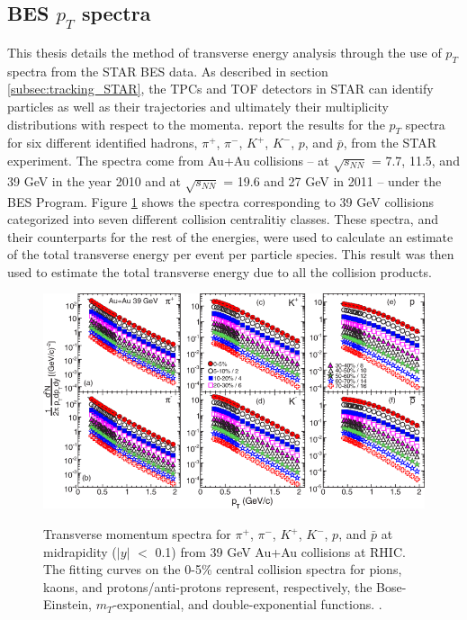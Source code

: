 \subsection{BES $p_{T}$ spectra}
This thesis details the method of transverse energy analysis through the use of $p_{T}$ spectra from the STAR BES data. As described in section \ref{subsec:tracking_STAR}, the TPCs and TOF detectors in STAR can identify particles as well as their trajectories and ultimately their multiplicity distributions with respect to the momenta. \citet{PhysRevC.96.044904} report the results for the $p_{T}$ spectra for six different identified hadrons, $\pi^+$, $\pi^-$, $K^+$, $K^-$, $p$, and $\bar{p}$, from the STAR experiment. The spectra come from Au+Au collisions -- at $\sqrt{s_{NN}}$ = 7.7, 11.5, and 39 GeV in the year 2010 and at $\sqrt{s_{NN}}$ = 19.6 and 27 GeV in 2011 -- under the BES Program. Figure \ref{fig:BESPaper_pTSpectra} \cite{PhysRevC.96.044904} shows the spectra corresponding to 39 GeV collisions categorized into seven different collision centralitiy classes. These spectra, and their counterparts for the rest of the energies, were used to calculate an estimate of the total transverse energy per event per particle species. This result was then used to estimate the total transverse energy due to all the collision products.
\begin{figure}[h]
  \centering
  \includegraphics[width=6.5in]{../figures/PhysRevC-96-044904_pTSpectra_39.png}\\
  \caption{Transverse momentum spectra for $\pi^{+}$, $\pi^{-}$, $K^+$, $K^{-}$, $p$, and $\bar{p}$ at midrapidity ($|y|$ $<$ 0.1) from 39 GeV Au+Au collisions at RHIC. The fitting curves on the 0-5\% central collision spectra for pions, kaons, and protons/anti-protons represent, respectively, the Bose-Einstein, $m_{T}$-exponential, and double-exponential functions. \cite{PhysRevC.96.044904}.}\label{fig:BESPaper_pTSpectra}
\end{figure}

